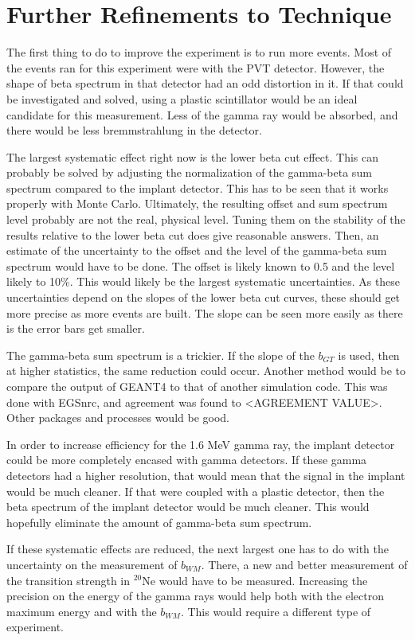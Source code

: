 \documentclass[../MaxHughesThesis.tex]{subfiles}
\begin{document}
\section{Further Refinements to Technique}
The first thing to do to improve the experiment is to run more events.
Most of the events ran for this experiment were with the PVT detector.
However, the shape of beta spectrum in that detector had an odd distortion in it.
If that could be investigated and solved, using a plastic scintillator would be an ideal candidate for this measurement.
Less of the gamma ray would be absorbed, and there would be less bremmstrahlung in the detector.

The largest systematic effect right now is the lower beta cut effect. 
This can probably be solved by adjusting the normalization of the gamma-beta sum spectrum compared to the implant detector. 
This has to be seen that it works properly with Monte Carlo.
Ultimately, the resulting offset and sum spectrum level probably are not the real, physical level.
Tuning them on the stability of the results relative to the lower beta cut does give reasonable answers.
Then, an estimate of the uncertainty to the offset and the level of the gamma-beta sum spectrum would have to be done.
The offset is likely known to 0.5 and the level likely to 10\%.
This would likely be the largest systematic uncertainties.
As these uncertainties depend on the slopes of the lower beta cut curves, these should get more precise as more events are built.
The slope can be seen more easily as there is the error bars get smaller.

The gamma-beta sum spectrum is a trickier. 
If the slope of the $b_{GT}$ is used, then at higher statistics, the same reduction could occur. 
Another method would be to compare the output of GEANT4 to that of another simulation code.
This was done with EGSnrc, and agreement was found to <AGREEMENT VALUE>.
Other packages and processes would be good.

In order to increase efficiency for the 1.6 MeV gamma ray, the implant detector could be more completely encased with gamma detectors.
If these gamma detectors had a higher resolution, that would mean that the signal in the implant would be much cleaner.
If that were coupled with a plastic detector, then the beta spectrum of the implant detector would be much cleaner.
This would hopefully eliminate the amount of gamma-beta sum spectrum.

If these systematic effects are reduced, the next largest one has to do with the uncertainty on the measurement of $b_{WM}$.
There, a new and better measurement of the transition strength in $^{20}$Ne would have to be measured.
Increasing the precision on the energy of the gamma rays would help both with the electron maximum energy and with the $b_{WM}$.
This would require a different type of experiment.
\end{document}
